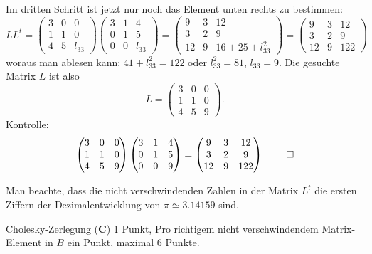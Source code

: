 \begin{loesung}
Im dritten Schritt ist jetzt nur noch das Element unten rechts zu bestimmen:
\[
LL^t=
\begin{pmatrix}
3&0&     0\\
1&1&     0\\
4&5&l_{33}
\end{pmatrix}
\begin{pmatrix}
3&1&     4\\
0&1&     5\\
0&0&l_{33}
\end{pmatrix}
=
\begin{pmatrix}
 9& 3& 12\\
 3& 2&  9\\
12& 9&16+25+l_{33}^2
\end{pmatrix}
=
\begin{pmatrix}
 9& 3& 12\\
 3& 2&  9\\
12& 9&122
\end{pmatrix}
\]
woraus man ablesen kann: $41+l_{33}^2=122$ oder $l_{33}^2=81$, $l_{33}=9$.
Die gesuchte Matrix $L$ ist also
\[
L=
\begin{pmatrix}
3&0&0\\
1&1&0\\
4&5&9
\end{pmatrix}.
\]
Kontrolle:
\[
\begin{pmatrix}
3&0&0\\
1&1&0\\
4&5&9
\end{pmatrix}
\begin{pmatrix}
3&1&4\\
0&1&5\\
0&0&9
\end{pmatrix}
=
\begin{pmatrix}
 9& 3& 12\\
 3& 2&  9\\
12& 9&122
\end{pmatrix}.
\qedhere
\]
\end{loesung}

\begin{diskussion}
Man beachte, dass die nicht verschwindenden Zahlen in der Matrix $L^t$
die ersten Ziffern der Dezimalentwicklung von $\pi\simeq3.14159$ sind.
\end{diskussion}

\begin{bewertung}
Cholesky-Zerlegung ({\bf C}) 1 Punkt,
Pro richtigem nicht verschwindendem Matrix-Element in $B$ ein Punkt,
maximal 6 Punkte.
\end{bewertung}

